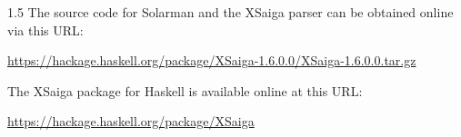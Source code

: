 \documentclass[fleqn, oneside, 12pt]{book}
\theoremstyle{definitionsty}
\newcommand{\uwinonehalfspacelen}{1.5}
\newcommand{\uwindefaultspacelen}{\uwinonehalfspacelen}
\newenvironment{uwindefaultspaceenv}%
{\begin{spacing}{\uwindefaultspacelen}}%
	{\end{spacing}}
\begin{document}
\begin{uwindefaultspaceenv}
The source code for Solarman and the XSaiga parser can be obtained online via this URL:

{\noindent \small \url{https://hackage.haskell.org/package/XSaiga-1.6.0.0/XSaiga-1.6.0.0.tar.gz}}

\noindent The XSaiga package for Haskell is available online at this URL:

{\noindent \small \url{https://hackage.haskell.org/package/XSaiga}}

%
%
%
%
%
%



\end{uwindefaultspaceenv}
\end{document}
